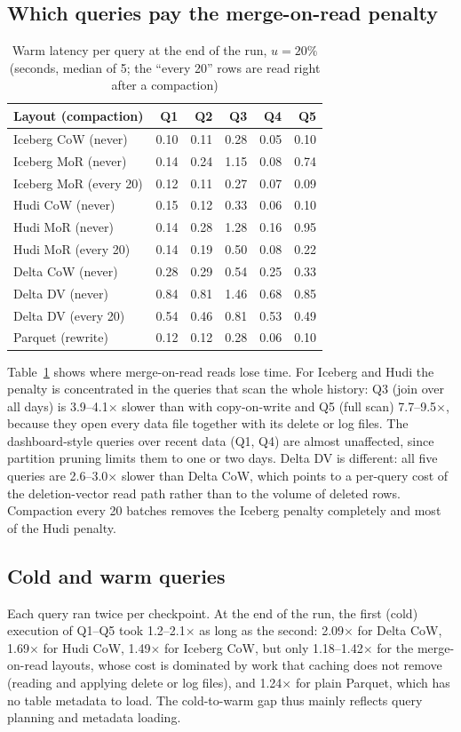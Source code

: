 \documentclass[conference]{IEEEtran}
\begin{document}
\subsection{Which queries pay the merge-on-read penalty}
\begin{table}[t]\centering
\caption{Warm latency per query at the end of the run, $u=20\%$ (seconds, median of 5; the ``every 20'' rows are read right after a compaction)}\label{tab:perquery}
\footnotesize
\begin{tabular}{@{}lrrrrr@{}}\toprule
Layout (compaction) & Q1 & Q2 & Q3 & Q4 & Q5\\\midrule
Iceberg CoW (never) & 0.10 & 0.11 & 0.28 & 0.05 & 0.10\\
Iceberg MoR (never) & 0.14 & 0.24 & 1.15 & 0.08 & 0.74\\
Iceberg MoR (every 20) & 0.12 & 0.11 & 0.27 & 0.07 & 0.09\\
Hudi CoW (never) & 0.15 & 0.12 & 0.33 & 0.06 & 0.10\\
Hudi MoR (never) & 0.14 & 0.28 & 1.28 & 0.16 & 0.95\\
Hudi MoR (every 20) & 0.14 & 0.19 & 0.50 & 0.08 & 0.22\\
Delta CoW (never) & 0.28 & 0.29 & 0.54 & 0.25 & 0.33\\
Delta DV (never) & 0.84 & 0.81 & 1.46 & 0.68 & 0.85\\
Delta DV (every 20) & 0.54 & 0.46 & 0.81 & 0.53 & 0.49\\
Parquet (rewrite) & 0.12 & 0.12 & 0.28 & 0.06 & 0.10\\\bottomrule
\end{tabular}
\end{table}
Table~\ref{tab:perquery} shows where merge-on-read reads lose time. For Iceberg and Hudi the penalty is concentrated in
the queries that scan the whole history: Q3 (join over all days) is 3.9--4.1$\times$ slower than with copy-on-write and
Q5 (full scan) 7.7--9.5$\times$, because they open every data file together with its delete or log files. The
dashboard-style queries over recent data (Q1, Q4) are almost unaffected, since partition pruning limits them to one or
two days. Delta DV is different: all five queries are 2.6--3.0$\times$ slower than Delta CoW, which points to a per-query
cost of the deletion-vector read path rather than to the volume of deleted rows. Compaction every 20 batches removes
the Iceberg penalty completely and most of the Hudi penalty.

\subsection{Cold and warm queries}
Each query ran twice per checkpoint. At the end of the run, the first (cold) execution of Q1--Q5 took
1.2--2.1$\times$ as long as the second: 2.09$\times$ for Delta CoW, 1.69$\times$ for Hudi CoW, 1.49$\times$ for
Iceberg CoW, but only 1.18--1.42$\times$ for the merge-on-read layouts, whose cost is dominated by work that caching does
not remove (reading and applying delete or log files), and 1.24$\times$ for plain Parquet, which has no table metadata
to load. The cold-to-warm gap thus mainly reflects query planning and metadata loading.
\end{document}
